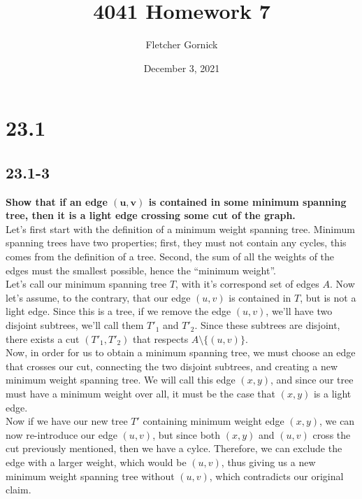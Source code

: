\documentclass[11pt]{article}
\title{\vspace{-1.0cm}4041 Homework 7}
\author{Fletcher Gornick}
\date{December 3, 2021}
\begin{document}
 \maketitle 

 \section*{23.1}
 \subsection*{23.1-3}
 \textbf{Show that if an edge \(\mathbf{(u,v)}\) is contained in some minimum spanning tree, then it
 is a light edge crossing some cut of the graph.} \\ 


 Let's first start with the definition of a minimum weight spanning tree.  Minimum spanning trees 
 have two properties; first, they must not contain any cycles, this comes from the definition of a 
 tree.  Second, the sum of all the weights of the edges must the smallest possible, hence the 
 ``minimum weight''. \\

 Let's call our minimum spanning tree \(T\), with it's correspond set of edges \(A\). Now let's 
 assume, to the contrary, that our edge \((u,v)\) is contained in \(T\), but is not a light edge.  
 Since this is a tree, if we remove the edge \((u,v)\), we'll have two disjoint subtrees, we'll call 
 them \(T'_1\) and \(T'_2\).  Since these subtrees are disjoint, there exists a cut \((T'_1,T'_2)\) 
 that respects \(A \setminus \{(u,v)\}\). \\ 

 Now, in order for us to obtain a minimum spanning tree, we must choose an edge that crosses our 
 cut, connecting the two disjoint subtrees, and creating a new minimum weight spanning tree.  We 
 will call this edge \((x,y)\), and since our tree must have a minimum weight over all, it must be 
 the case that \((x,y)\) is a light edge. \\

 Now if we have our new tree \(T'\) containing minimum weight edge \((x,y)\), we can now re-introduce 
 our edge \((u,v)\), but since both \((x,y)\) and \((u,v)\) cross the cut previously mentioned, then 
 we have a cylce.  Therefore, we can exclude the edge with a larger weight, which would be \((u,v)\), 
 thus giving us a new minimum weight spanning tree without \((u,v)\), which contradicts our original 
 claim.
 \newpage
\end{document}
